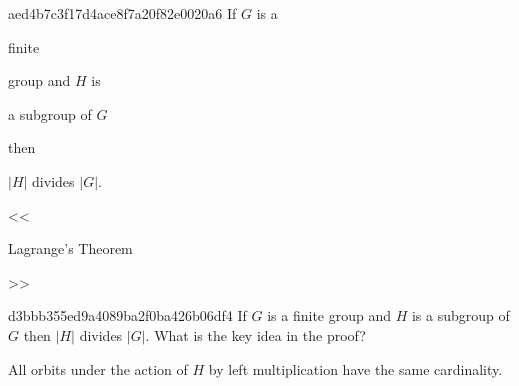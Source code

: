 \begin{note}{aed4b7c3f17d4ace8f7a20f82e0020a6}
    If \({ G }\) is a \begin{icloze}{3}finite\end{icloze} group and \({ H }\) is \begin{icloze}{2}a subgroup of \({ G }\)\end{icloze} then \begin{icloze}{1}\({ \left\lvert H \right\rvert }\) divides \({ \left\lvert G \right\rvert }\).\end{icloze}

    \begin{center}
        \tiny
        <<\begin{icloze}{4}Lagrange's Theorem\end{icloze}>>
    \end{center}
\end{note}

\begin{note}{d3bbb355ed9a4089ba2f0ba426b06df4}
    If \({ G }\) is a finite group and \({ H }\) is a subgroup of \({ G }\) then \({ \left\lvert H \right\rvert }\) divides \({ \left\lvert G \right\rvert }\).
    What is the key idea in the proof?

    \begin{cloze}{1}
        All orbits under the action of \({ H }\) by left multiplication have the same cardinality.
    \end{cloze}
\end{note}


